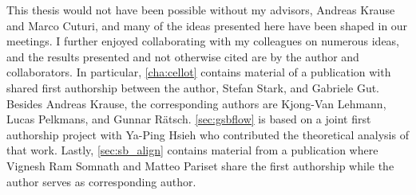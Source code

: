 This thesis would not have been possible without my advisors, Andreas Krause and Marco Cuturi, and many of the ideas presented here have been shaped in our meetings. I further enjoyed collaborating with my colleagues on numerous ideas, and the results presented and not otherwise cited are by the author and collaborators. In particular, \cref{cha:cellot} contains material of a publication with shared first authorship between the author, Stefan Stark, and Gabriele Gut. Besides Andreas Krause, the corresponding authors are Kjong-Van Lehmann, Lucas Pelkmans, and Gunnar R\"atsch.
\cref{sec:gsbflow} is based on a joint first authorship project with Ya-Ping Hsieh who contributed the theoretical analysis of that work. Lastly, \cref{sec:sb_align} contains material from a publication where Vignesh Ram Somnath and Matteo Pariset share the first authorship while the author serves as corresponding author.

